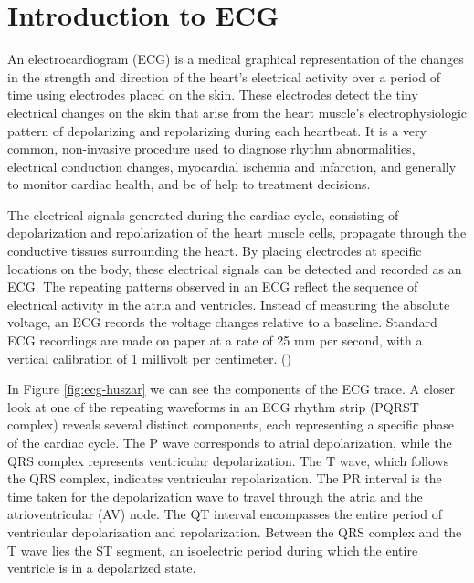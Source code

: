 \documentclass{mldsmsc}
\begin{document}
\clearpage

\section{Introduction to ECG}

An electrocardiogram (ECG) is a medical graphical representation of the changes in the strength and direction of the heart's electrical activity over a period of time using electrodes placed on the skin. These electrodes detect the tiny electrical changes on the skin that arise from the heart muscle's electrophysiologic pattern of depolarizing and repolarizing during each heartbeat. It is a very common, non-invasive procedure used to diagnose rhythm abnormalities, electrical conduction changes, myocardial ischemia and infarction, and generally to monitor cardiac health, and be of help to treatment decisions. \newline

\noindent The electrical signals generated during the cardiac cycle, consisting of depolarization and repolarization of the heart muscle cells, propagate through the conductive tissues surrounding the heart. By placing electrodes at specific locations on the body, these electrical signals can be detected and recorded as an ECG. The repeating patterns observed in an ECG reflect the sequence of electrical activity in the atria and ventricles. Instead of measuring the absolute voltage, an ECG records the voltage changes relative to a baseline. Standard ECG recordings are made on paper at a rate of 25 mm per second, with a vertical calibration of 1 millivolt per centimeter. (\cite{alma991000225790601591}) \newline

\noindent In Figure \ref{fig:ecg-huszar} we can see the components of the ECG trace. A closer look at one of the repeating waveforms in an ECG rhythm strip (PQRST complex) reveals several distinct components, each representing a specific phase of the cardiac cycle. The P wave corresponds to atrial depolarization, while the QRS complex represents ventricular depolarization. The T wave, which follows the QRS complex, indicates ventricular repolarization. The PR interval is the time taken for the depolarization wave to travel through the atria and the atrioventricular (AV) node. The QT interval encompasses the entire period of ventricular depolarization and repolarization. Between the QRS complex and the T wave lies the ST segment, an isoelectric period during which the entire ventricle is in a depolarized state. \newline
\end{document}
